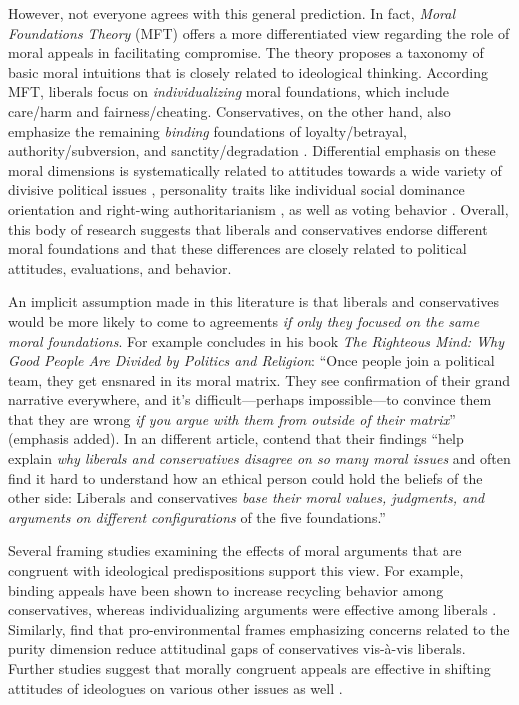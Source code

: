 However, not everyone agrees with this general prediction. In fact, \textit{Moral Foundations Theory} (MFT) offers a more differentiated view regarding the role of moral appeals in facilitating compromise. The theory proposes a taxonomy of basic moral intuitions that is closely related to ideological thinking. According MFT, liberals focus on \emph{individualizing} moral foundations, which include care/harm and fairness/cheating. Conservatives, on the other hand, also emphasize the remaining \emph{binding} foundations of loyalty/betrayal, authority/subversion, and sanctity/degradation \citep{haidt2007morality, graham2009liberals}. Differential emphasis on these moral dimensions is systematically related to attitudes towards a wide variety of divisive political issues \citep[e.g.][]{koleva2012tracing, kertzer2014moral, low2015moral}, personality traits like individual social dominance orientation and right-wing authoritarianism \citep{federico2013mapping}, as well as voting behavior \citep{franks2015using,kraft2018measuring}. Overall, this body of research suggests that liberals and conservatives endorse different moral foundations and that these differences are closely related to political attitudes, evaluations, and behavior.

An implicit assumption made in this literature is that liberals and conservatives would be more likely to come to agreements \emph{if only they focused on the same moral foundations}. For example \citet[365]{haidt2012righteous} concludes in his book \emph{The Righteous Mind: Why Good People Are Divided by Politics and Religion}: ``Once people join a political team, they get ensnared in its moral matrix. They see confirmation of their grand
narrative everywhere, and it's difficult---perhaps impossible---to convince them that they are wrong \emph{if you argue with them from outside of their matrix}'' (emphasis added). In an different article, \citet[1040]{graham2009liberals} contend that their findings ``help explain \emph{why liberals and conservatives disagree on so many moral issues} and often find it hard to understand how an ethical person could hold the beliefs of the other side: Liberals and conservatives \emph{base their moral values, judgments, and arguments on different configurations} of the five foundations.''

Several framing studies examining the effects of moral arguments that are congruent with ideological predispositions support this view. For example, binding appeals have been shown to increase recycling behavior among conservatives, whereas individualizing arguments were effective among liberals \citep{kidwell2013getting}. Similarly, \citet{feinberg2013moral} find that pro-environmental frames emphasizing concerns related to the purity dimension reduce attitudinal gaps of conservatives vis-\`a-vis liberals. Further studies suggest that morally congruent appeals are effective in shifting attitudes of ideologues on various other issues as well \citep[e.g.,][]{day2014shifting,feinberg2015gulf}.

